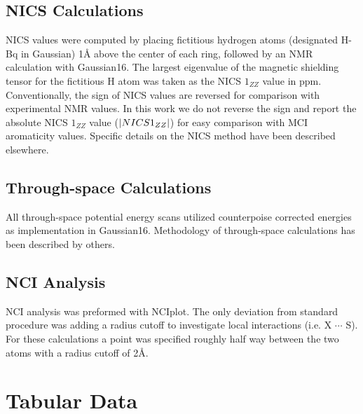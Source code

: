 \subsection{NICS Calculations}
NICS values were computed by placing fictitious hydrogen atoms (designated H-Bq in Gaussian) 1\si{\angstrom} above the center of each ring, followed by an NMR calculation with Gaussian16.\cite{g16} The largest eigenvalue of the magnetic shielding tensor for the fictitious H atom was taken as the NICS $1_{ZZ}$ value in ppm. Conventionally, the sign of NICS values are reversed for comparison with experimental NMR values. In this work we do not reverse the sign and report the absolute NICS $1_{ZZ}$ value ($\abs*{NICS 1_{ZZ}}$) for easy comparison with MCI aromaticity values. Specific details on the NICS method have been described elsewhere.\cite{Fallah-Bagher-Shaidaei2006, Chen2005}

\subsection{Through-space Calculations}
All through-space potential energy scans utilized counterpoise corrected energies as implementation in Gaussian16. Methodology of through-space calculations has been described by others.\cite{Jackson2013}

\subsection{NCI Analysis}
NCI analysis was preformed with NCIplot.\cite{Johnson2010, Contreras-Garcia2011} The only deviation from standard procedure was adding a radius cutoff to investigate local interactions (i.e. X $\cdots$ S). For these calculations a point was specified roughly half way between the two atoms with a radius cutoff of 2\AA.

\clearpage
\section{Tabular Data}

